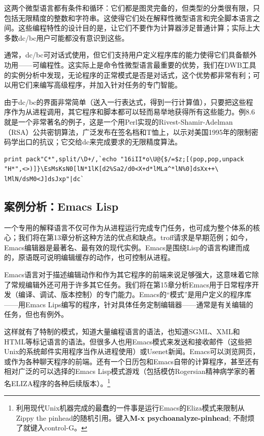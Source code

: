 \documentclass[12pt,oneside]{book}
\begin{document}
这两个微型语言都有条件和循环：它们都是图灵完备的，但类型的分类很有限，只包括无限精度的整数和字符串。这使得它们处在解释性微型语言和完全脚本语言之间。这些编程特性的设计目的是，让它们不要作为计算器涉足普通计算；实际上大多数dc/bc用户可能都没有意识到这些。

通常，dc/bc可对话式使用，但它们支持用户定义程序库的能力使得它们具备额外功用——可编程性。这实际上是命令性微型语言最重要的优势，我们在DWB工具的实例分析中发现，无论程序的正常模式是否是对话式，这个优势都非常有利；可以用它们来编写高级程序，并加入针对任务的专门智能。

由于dc/bc的界面非常简单（送入一行表达式，得到一行计算值），只要把这些程序作为从进程调用，其它程序和脚本都可以轻而易举地获得所有这些能力。例8.6就是一个非常著名的例子，这是一个用Perl实现的Rivest-Shamir-Adelman （RSA）公共密钥算法，广泛发布在签名档和T恤上，以示对美国1995年的限制密码学出口的抗议；它交给dc来完成要求的无限精度算法。


\begin{Verbatim}[label=例8.6 使用dc的RSA实现]
print pack"C*",split/\D+/,`echo "16iII*o\U@{$/=$z;[(pop,pop,unpack
"H*",<>)]}\EsMsKsN0[lN*1lK[d2%Sa2/d0<X+d*lMLa^*lN%0]dsXx++\
lMlN/dsM0<J]dsJxp"|dc`
\end{Verbatim}




\subsection{案例分析：Emacs Lisp}
 一个专用的解释语言不仅可作为从进程运行完成专门任务，也可成为整个体系的核心；我们将在第13章分析这种方法的优点和缺点。troff请求是早期范例；如今，Emacs编辑器是最著名、最有效的现代实例。Emacs是围绕Lisp的语言构建而成的，原语既可说明编辑缓存的动作，也可控制从进程。

Emacs语言对于描述编辑动作和作为其它程序的前端来说足够强大，这意味着它除了常规编辑外还可用于许多其它任务。我们将在第15章分析Emacs用于日常程序开发（编译、调试、版本控制）的专门能力。Emacs的“模式”是用户定义的程序库——用Emacs Lips编写的程序，针对具体任务定制编辑器——通常是有关编辑的任务，但也有例外。

这样就有了特制的模式，知道大量编程语言的语法，也知道SGML、XML和HTML等标记语言的语法。但很多人也用Emacs模式来发送和接收邮件（这些把Unix的系统邮件实用程序当作从进程使用）或Usenet新闻。Emacs可以浏览网页，或作为各种聊天程序的前端。还有一个日历包和Emacs自带的计算程序，甚至还有相对广泛的可以选择的Emacs Lisp模式游戏（包括模仿Rogersian精神病学家的著名ELIZA程序的各种后续版本）。\footnote{利用现代Unix机器完成的最蠢的一件事是运行Emacs的Eliza模式来限制从Zippy the pinhead的随机引用。键入\textbf{M-x psychoanalyze-pinhead}; 不耐烦了就键入control-G。}
\end{document}
